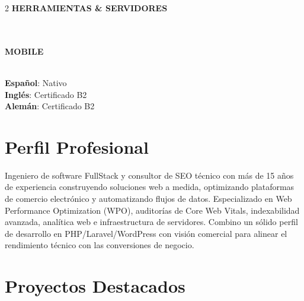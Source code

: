 \documentclass[10pt,a4paper]{article}
\begin{document}
\begin{paracol}{2}
\vspace{0.4em}
\textbf{\color{primary}\footnotesize HERRAMIENTAS \& SERVIDORES} \\
   \\
   \\
  

\vspace{0.4em}
\textbf{\color{primary}\footnotesize MOBILE} \\
   \\
 

\textbf{Español}: Nativo \\
\textbf{Inglés}: Certificado B2 \\
\textbf{Alemán}: Certificado B2

\switchcolumn


\section{Perfil Profesional}
Ingeniero de software FullStack y consultor de SEO técnico con más de 15 años de experiencia construyendo soluciones web a medida, optimizando plataformas de comercio electrónico y automatizando flujos de datos. Especializado en Web Performance Optimization (WPO), auditorías de Core Web Vitals, indexabilidad avanzada, analítica web e infraestructura de servidores. Combino un sólido perfil de desarrollo en PHP/Laravel/WordPress con visión comercial para alinear el rendimiento técnico con las conversiones de negocio.

\section{Proyectos Destacados}




\end{paracol}
\end{document}
